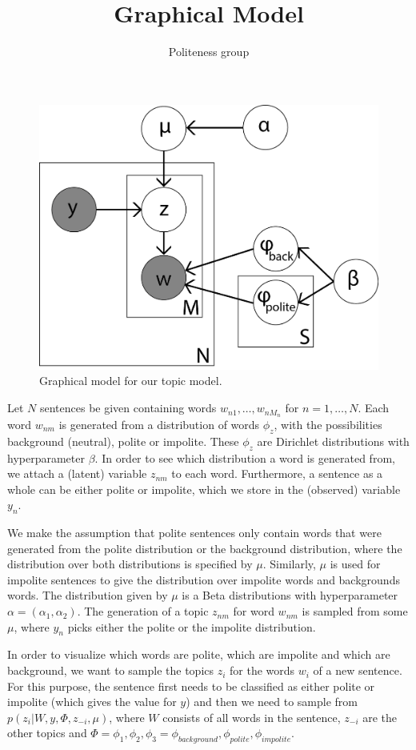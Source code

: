 \documentclass[11pt, english]{article}
\title{Graphical Model}
\author{Politeness group}
\begin{document}
\maketitle
\begin{figure}
    \centering
    \includegraphics[scale=0.5]{Model}
    \caption{Graphical model for our topic model.}
\end{figure}
Let $N$ sentences be given containing words $w_{n1},\dots,w_{nM_n}$ for $n=1,\dots,N$. Each word $w_{nm}$ is generated from a distribution of words $\phi_z$, with the possibilities background (neutral), polite or impolite. These $\phi_z$ are Dirichlet distributions with hyperparameter $\beta$. In order to see which distribution a word is generated from, we attach a (latent) variable $z_{nm}$ to each word. Furthermore, a sentence as a whole can be either polite or impolite, which we store in the (observed) variable $y_n$. 

We make the assumption that polite sentences only contain words that were generated from the polite distribution or the background distribution, where the distribution over both distributions is specified by $\mu$. Similarly, $\mu$ is used for impolite sentences to give the distribution over impolite words and backgrounds words. The distribution given by $\mu$ is a Beta distributions with hyperparameter $\alpha=(\alpha_1,\alpha_2)$. The generation of a topic $z_{nm}$ for word $w_{nm}$ is sampled from some $\mu$, where $y_n$ picks either the polite or the impolite distribution.

In order to visualize which words are polite, which are impolite and which are background, we want to sample the topics $z_i$ for the words $w_i$ of a new sentence. For this purpose, the sentence first needs to be classified as either polite or impolite (which gives the value for $y$) and then we need to sample from $p(z_{i}|W,y,\Phi,z_{-i},\mu)$, where $W$ consists of all words in the sentence, $z_{-i}$ are the other topics and $\Phi = \phi_1,\phi_2,\phi_3=\phi_{background},\phi_{polite},\phi_{impolite}$. 
\end{document}
